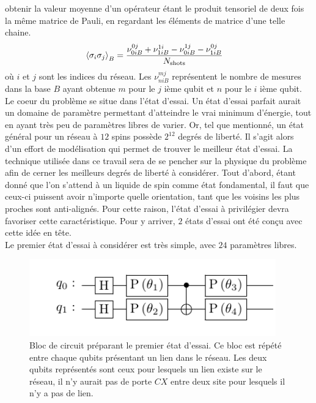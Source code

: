 \documentclass[../main.tex]{subfiles}
\begin{document}
        obtenir la valeur moyenne d'un opérateur étant le produit tensoriel de
        deux fois la même matrice de Pauli, en regardant les éléments de matrice
        d'une telle chaine.
        \begin{align}
            \expval{\sigma_i\sigma_j}_B&=\frac{\nu_{0iB}^{0j}+\nu_{1iB}^{1i}-\nu_{0iB}^{1j}-\nu_{1iB}^{0j}}{N_{\text{shots}}}
        \end{align}
        où $i$ et $j$ sont les indices du réseau. Les $\nu^{mj}_{niB}$ représentent le nombre
        de mesures dans la base $B$ ayant obtenue $m$ pour le $j$ ième qubit et $n$ pour le $i$ ième
        qubit.\\
        Le coeur du problème se situe dans l'état d'essai. Un état d'essai
        parfait aurait un domaine de paramètre permettant d'atteindre le vrai
        minimum d'énergie, tout en ayant très peu de paramètres libres de varier.
        Or, tel que mentionné, un état général pour un réseau à $12$ spins
        possède $2^{12}$ degrés de liberté. Il s'agit alors d'un effort de
        modélisation qui permet de trouver le meilleur état d'essai. La technique
        utilisée dans ce travail sera de se pencher sur la physique du problème
        afin de cerner les meilleurs degrés de liberté à considérer. Tout d'abord,
        étant donné que l'on s'attend à un liquide de spin comme état fondamental,
        il faut que ceux-ci puissent avoir n'importe quelle orientation, tant
        que les voisins les plus proches sont anti-alignés. Pour cette raison,
        l'état d'essai à privilégier devra favoriser cette caractéristique.
        Pour y arriver, $2$ états d'essai ont été conçu avec cette idée en tête.\\
        Le premier état d'essai à considérer est très simple, avec $24$ paramètres
        libres.
        \begin{figure}[H]
            \begin{center}
                \includegraphics[width=0.95\textwidth]{figs/ansatz1.pdf}
            \end{center}
            \caption{Bloc de circuit préparant le premier état d'essai. Ce bloc est
            répété entre chaque qubits présentant un lien dans le réseau. Les deux
            qubits représentés sont ceux pour lesquels un lien existe sur le réseau,
            il n'y aurait pas de porte $CX$ entre deux site pour lesquels il n'y a
            pas de lien.}
            \label{fig:}
        \end{figure}
\end{document}
